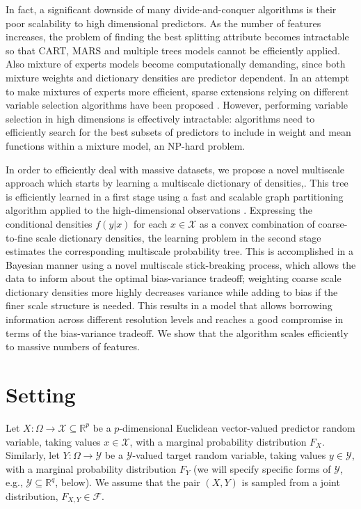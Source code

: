 \documentclass{article} %
\newcommand{\Real}{\mathbb{R}}
\providecommand{\mc}[1]{\mathcal{#1}}
\newcommand{\from}{{\ensuremath{\colon}}}  %
\begin{document}
In fact, a significant downside of many divide-and-conquer algorithms is their poor scalability to high dimensional predictors. As the number of features increases, the problem of finding the best splitting attribute becomes intractable so that CART, MARS and multiple trees models cannot be efficiently applied. Also mixture of experts models become computationally demanding, since both mixture weights and dictionary densities are predictor dependent. In an attempt to make mixtures of experts more efficient, sparse extensions relying on different variable selection algorithms have been proposed \cite{SparseMoF}. However, performing variable selection in high dimensions is effectively intractable: algorithms need to efficiently search for the best subsets of predictors to include in weight and mean functions within a mixture model, an NP-hard problem.

 In order to efficiently deal with massive datasets, we propose a novel multiscale approach which starts by learning a multiscale dictionary of densities,. This tree is efficiently learned in a first stage using a fast and scalable graph partitioning algorithm applied to the high-dimensional observations \cite{metis}.  Expressing the conditional densities $f(y|x)$ for each $x \in \mathcal{X}$ as a convex combination of coarse-to-fine scale dictionary densities, the learning problem in the second stage estimates the corresponding multiscale probability tree.  This is accomplished in a Bayesian manner using a novel multiscale stick-breaking process, which allows the data to inform about the optimal bias-variance tradeoff; weighting coarse scale dictionary densities more highly decreases variance while adding to bias if the finer scale structure is needed.  This results in a model that allows borrowing information across different resolution levels and reaches a good compromise in terms of the bias-variance tradeoff. We show that the algorithm scales efficiently to massive numbers of features. 


\section{Setting} \label{sec:setting}
Let $X \from \Omega \to \mc{X} \subseteq \Real^p$ be a 
$p$-dimensional Euclidean vector-valued predictor random variable, taking values $x \in \mc{X}$, with a marginal probability distribution $F_X$.  
Similarly, let $Y \from \Omega \to \mc{Y}$ 
be a $\mc{Y}$-valued target random variable, taking values $y \in \mc{Y}$, with a marginal probability distribution $F_Y$ (we will specify specific forms of $\mc{Y}$, e.g., $\mc{Y} \subseteq \Real^q$, below).  We assume that the pair $(X,Y)$ is sampled from a joint distribution, $F_{X,Y} \in \mc{F}$.
\end{document}
